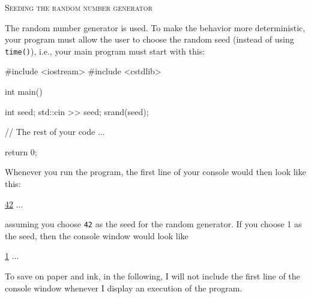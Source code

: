 \textsc{Seeding the random number generator}

The random number generator is used.
To make the behavior more deterministic, your program must allow the
user to choose the random seed (instead of using
\verb!time()!), i.e., your main program
must start with this:

\begin{console}[frame=single]
#include <iostream>
#include <cstdlib>

int main()
{
    int seed;
    std::cin >> seed;
    srand(seed);

    // The rest of your code ...
    
    return 0;
}
\end{console}

Whenever you run the program,
the first line of your console would then look
like this:
\begin{console}[commandchars=\\\{\}]
\underline{42}
...
\end{console}
assuming you choose \verb!42! as the seed for the random generator.
If you choose 1 as the seed, then the console window would look like
\begin{console}[commandchars=\\\{\}]
\underline{1}
...
\end{console}

To save on paper and ink, in the following,
I will not include the first line of the console
window whenever I display an execution of the program.

